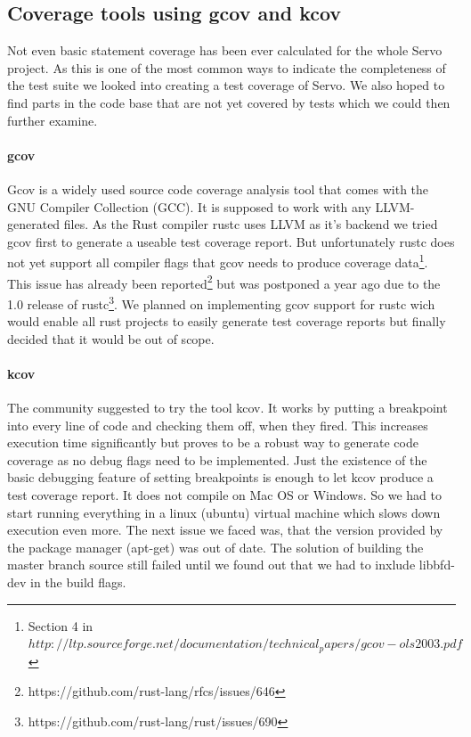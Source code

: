 \documentclass{scrartcl}
\begin{document}
\subsection{Coverage tools using gcov and kcov}
Not even basic statement coverage has been ever calculated for the whole Servo project. As this is one of the most common ways to indicate the completeness of the test suite we looked into creating a test coverage of Servo. We also hoped to find parts in the code base that are not yet covered by tests which we could then further examine. 

\paragraph{gcov}
Gcov is a widely used source code coverage analysis tool that comes with the GNU Compiler Collection (GCC). It is supposed to work with any LLVM-generated files. As the Rust compiler rustc uses LLVM as it's backend we tried gcov first to generate a useable test coverage report. But unfortunately rustc does not yet support all compiler flags that gcov needs to produce coverage data\footnote{Section 4 in $http://ltp.sourceforge.net/documentation/technical_papers/gcov-ols2003.pdf$}. This issue has already been reported\footnote{https://github.com/rust-lang/rfcs/issues/646} but was postponed a year ago due to the 1.0 release of rustc\footnote{https://github.com/rust-lang/rust/issues/690}. We planned on implementing gcov support for rustc wich would enable all rust projects to easily generate test coverage reports but finally decided that it would be out of scope.

\paragraph{kcov}
The community suggested to try the tool kcov. It works by putting a breakpoint into every line of code and checking them off, when they fired. This increases execution time significantly but proves to be a robust way to generate code coverage as no debug flags need to be implemented. Just the existence of the basic debugging feature of setting breakpoints is enough to let kcov produce a test coverage report. It does not compile on Mac OS or Windows. So we had to start running everything in a linux (ubuntu) virtual machine which slows down execution even more. The next issue we faced was, that the version provided by the package manager (apt-get) was out of date. The solution of building the master branch source still failed until we found out that we had to inxlude libbfd-dev in the build flags.\\
\end{document}
